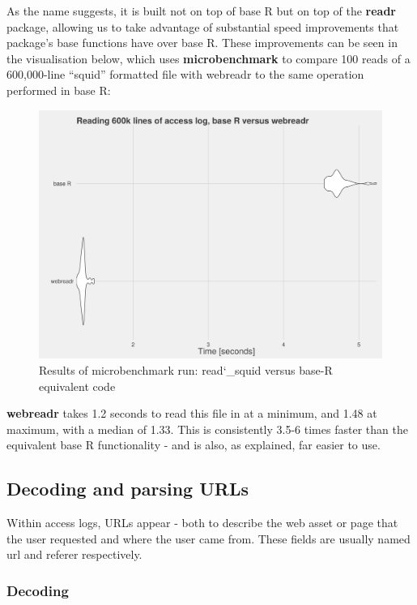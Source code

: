 As the name suggests, it is built not on top of base R but on top of the
\textbf{readr} \citep{readr} package, allowing us to take advantage of
substantial speed improvements that package's base functions have over
base R. These improvements can be seen in the visualisation below, which
uses \textbf{microbenchmark} \citep{microbenchmark} to compare 100 reads
of a 600,000-line ``squid'' formatted file with webreadr to the same
operation performed in base R:

\begin{figure}[h]
    \centering
    \includegraphics[scale=0.4]{reading_benchmarks}
    \caption{Results of microbenchmark run: read\char`_squid versus base-R equivalent code}
\end{figure}

\textbf{webreadr} takes 1.2 seconds to read this file in at a minimum,
and 1.48 at maximum, with a median of 1.33. This is consistently 3.5-6
times faster than the equivalent base R functionality - and is also, as
explained, far easier to use.

\subsection{Decoding and parsing URLs}\label{decoding-and-parsing-urls}

Within access logs, URLs appear - both to describe the web asset or page
that the user requested and where the user came from. These fields are
usually named url and referer respectively.

\subsubsection{Decoding}\label{decoding}


